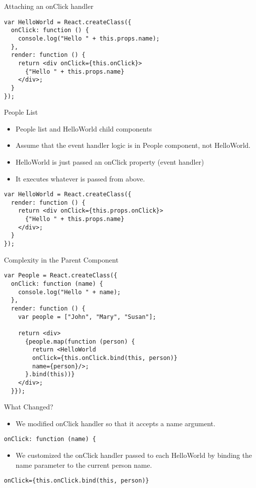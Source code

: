 \documentclass[presentation]{beamer}
\begin{document}
\begin{frame}[fragile,label=sec-8]{Attaching an onClick handler}
 \begin{verbatim}
var HelloWorld = React.createClass({
  onClick: function () {
    console.log("Hello " + this.props.name);
  },
  render: function () {
    return <div onClick={this.onClick}>
      {"Hello " + this.props.name}
    </div>;
  }
});
\end{verbatim}
\end{frame}

\begin{frame}[fragile,label=sec-9]{People List}
 \begin{itemize}
\item People list and HelloWorld child components
\item Assume that the event handler logic is in People component, not HelloWorld.
\item HelloWorld is just passed an onClick property (event handler)
\item It executes whatever is passed from above.
\end{itemize}

\begin{verbatim}
var HelloWorld = React.createClass({
  render: function () {
    return <div onClick={this.props.onClick}>
      {"Hello " + this.props.name}
    </div>;
  }
});
\end{verbatim}
\end{frame}

\begin{frame}[fragile,label=sec-10]{Complexity in the Parent Component}
 \begin{verbatim}
var People = React.createClass({
  onClick: function (name) {
    console.log("Hello " + name);
  },
  render: function () {
    var people = ["John", "Mary", "Susan"];

    return <div>
      {people.map(function (person) {
        return <HelloWorld
        onClick={this.onClick.bind(this, person)}
        name={person}/>;
      }.bind(this))}
    </div>;
  }});
\end{verbatim}
\end{frame}

\begin{frame}[fragile,label=sec-11]{What Changed?}
 \begin{itemize}
\item We modified onClick handler so that it accepts a name argument.
\end{itemize}
\begin{verbatim}
onClick: function (name) {
\end{verbatim}

\begin{itemize}
\item We customized the onClick handler passed to each HelloWorld by binding the
name parameter to the current person name.
\end{itemize}
\begin{verbatim}
onClick={this.onClick.bind(this, person)}
\end{verbatim}
\end{frame}
\end{document}

